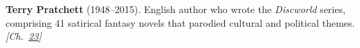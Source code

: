\textbf{Terry Pratchett} (1948–2015). English author who wrote the \emph{Discworld} series, comprising 41 satirical fantasy novels that parodied cultural and political themes. \emph{[Ch.~\hyperref[ch:blackholetimedilationredshift]{23}]}

